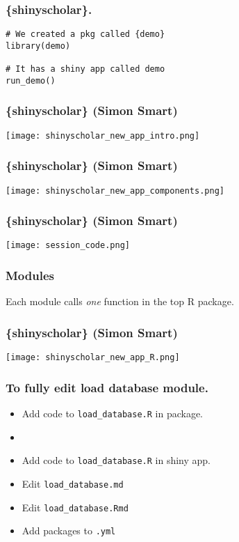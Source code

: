 \documentclass[handout, aspectratio = 169, xcolor={dvipsnames}]{beamer}
\begin{document}
\begin{frame}[fragile]
\frametitle{\{shinyscholar\}.}
\footnotesize{
\vspace{1mm}
\begin{Verbatim}
# We created a pkg called {demo}
library(demo)

# It has a shiny app called demo
run_demo()
\end{Verbatim}
}
\end{frame} 


\begin{frame}
\frametitle{\{shinyscholar\} (Simon Smart)}
\texttt{[image: shinyscholar\_new\_app\_intro.png]}
\end{frame} 

\begin{frame}
\frametitle{\{shinyscholar\} (Simon Smart)}
\texttt{[image: shinyscholar\_new\_app\_components.png]}
\end{frame} 






\begin{frame}
\frametitle{\{shinyscholar\} (Simon Smart)}
\texttt{[image: session\_code.png]}
\end{frame} 




\begin{frame}
\frametitle{Modules}
Each module calls \emph{one} function in the top R package.
\end{frame} 



\begin{frame}
\frametitle{\{shinyscholar\} (Simon Smart)}
\texttt{[image: shinyscholar\_new\_app\_R.png]}
\end{frame} 





\begin{frame}
\frametitle{To fully edit load database module.}

\begin{itemize}
\item Add code to \texttt{load\_database.R} in package.
\item 
\item Add code to \texttt{load\_database.R} in shiny app.
\item Edit \texttt{load\_database.md}
\item Edit \texttt{load\_database.Rmd}
\item Add packages to \texttt{.yml}
\end{itemize}

\end{frame} 
\end{document}
